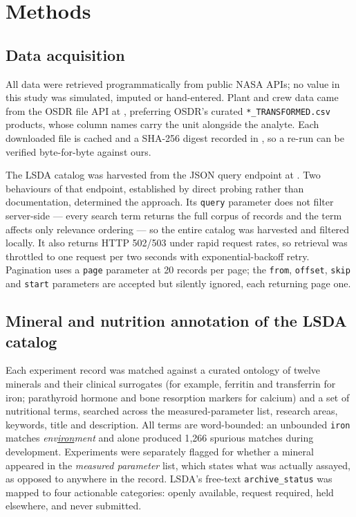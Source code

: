 \section{Methods}

\subsection{Data acquisition}

All data were retrieved programmatically from public NASA APIs; no value in this
study was simulated, imputed or hand-entered. Plant and crew data came from the
OSDR file API at
,
preferring OSDR's curated \texttt{*\_TRANSFORMED.csv} products, whose column
names carry the unit alongside the analyte. Each downloaded file is cached and a
SHA-256 digest recorded in , so a re-run can be
verified byte-for-byte against ours.

The LSDA catalog was harvested from the JSON query endpoint at
. Two behaviours of that
endpoint, established by direct probing rather than documentation, determined
the approach. Its \texttt{query} parameter does not filter server-side --- every
search term returns the full corpus of \LSDATotal{} records and the term affects
only relevance ordering --- so the entire catalog was harvested and filtered
locally. It also returns HTTP 502/503 under rapid request rates, so retrieval
was throttled to one request per two seconds with exponential-backoff retry.
Pagination uses a \texttt{page} parameter at 20 records per page; the
\texttt{from}, \texttt{offset}, \texttt{skip} and \texttt{start} parameters are
accepted but silently ignored, each returning page one.

\subsection{Mineral and nutrition annotation of the LSDA catalog}

Each experiment record was matched against a curated ontology of twelve minerals
and their clinical surrogates (for example, ferritin and transferrin for iron;
parathyroid hormone and bone resorption markers for calcium) and a set of
nutritional terms, searched across the measured-parameter list, research areas,
keywords, title and description. All terms are word-bounded: an unbounded
\texttt{iron} matches \emph{env\underline{iron}ment} and alone produced 1{,}266
spurious matches during development. Experiments were separately flagged for
whether a mineral appeared in the \emph{measured parameter} list, which states
what was actually assayed, as opposed to anywhere in the record. LSDA's
free-text \texttt{archive\_status} was mapped to four actionable categories:
openly available, request required, held elsewhere, and never submitted.

